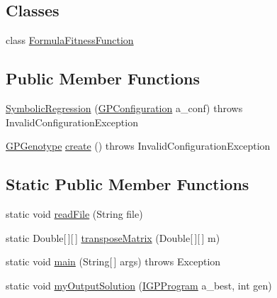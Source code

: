\subsection*{Classes}
\begin{DoxyCompactItemize}
\item 
class \hyperlink{classexamples_1_1gp_1_1symbolic_regression_1_1_symbolic_regression_1_1_formula_fitness_function}{Formula\-Fitness\-Function}
\end{DoxyCompactItemize}
\subsection*{Public Member Functions}
\begin{DoxyCompactItemize}
\item 
\hyperlink{classexamples_1_1gp_1_1symbolic_regression_1_1_symbolic_regression_a4d4973f5179f75803bbccd8728e5279d}{Symbolic\-Regression} (\hyperlink{classorg_1_1jgap_1_1gp_1_1impl_1_1_g_p_configuration}{G\-P\-Configuration} a\-\_\-conf)  throws Invalid\-Configuration\-Exception 
\item 
\hyperlink{classorg_1_1jgap_1_1gp_1_1impl_1_1_g_p_genotype}{G\-P\-Genotype} \hyperlink{classexamples_1_1gp_1_1symbolic_regression_1_1_symbolic_regression_adcf4fa3ad36bc35add7988d718e98311}{create} ()  throws Invalid\-Configuration\-Exception 
\end{DoxyCompactItemize}
\subsection*{Static Public Member Functions}
\begin{DoxyCompactItemize}
\item 
static void \hyperlink{classexamples_1_1gp_1_1symbolic_regression_1_1_symbolic_regression_af25800b8f3bf079af265efaa11b26fc9}{read\-File} (String file)
\item 
static Double\mbox{[}$\,$\mbox{]}\mbox{[}$\,$\mbox{]} \hyperlink{classexamples_1_1gp_1_1symbolic_regression_1_1_symbolic_regression_ad032436a7db934626b4b369a66728cfb}{transpose\-Matrix} (Double\mbox{[}$\,$\mbox{]}\mbox{[}$\,$\mbox{]} m)
\item 
static void \hyperlink{classexamples_1_1gp_1_1symbolic_regression_1_1_symbolic_regression_a88f5444b9429755a7859721f2eb2999d}{main} (String\mbox{[}$\,$\mbox{]} args)  throws Exception 
\item 
static void \hyperlink{classexamples_1_1gp_1_1symbolic_regression_1_1_symbolic_regression_ac09b048b9537b5c6315ecba9c1836f1a}{my\-Output\-Solution} (\hyperlink{interfaceorg_1_1jgap_1_1gp_1_1_i_g_p_program}{I\-G\-P\-Program} a\-\_\-best, int gen)
\end{DoxyCompactItemize}
